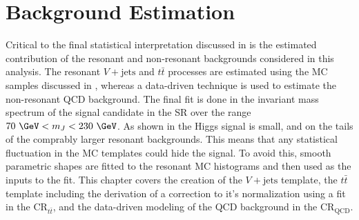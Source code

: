 \chapter{Background Estimation} \label{chap:background}

Critical to the final statistical interpretation discussed in 
is the estimated contribution of the resonant and non-resonant backgrounds
considered in this analysis. The resonant $V+\text{jets}$ and $t\bar{t}$
processes are estimated using the MC samples discussed in
, whereas a data-driven technique is used to estimate the
non-resonant QCD background. The final fit is done in the invariant mass
spectrum of the signal candidate in the SR over the range $70~\GeV < m_{J} <
230~\GeV$.  As shown in  the Higgs signal is
small, and on the tails of the comprably larger resonant backgrounds.  This
means that any statistical fluctuation in the MC templates could hide the
signal.  To avoid this, smooth parametric shapes are fitted to the resonant MC
histograms and then used as the inputs to the fit.  This chapter covers the
creation of the $V+\text{jets}$ template, the $t\bar{t}$ template including the
derivation of a correction to it's normalization using a fit in the
$\text{CR}_{t\bar{t}}$, and the data-driven modeling of the QCD background in
the $\text{CR}_{\text{QCD}}$.




